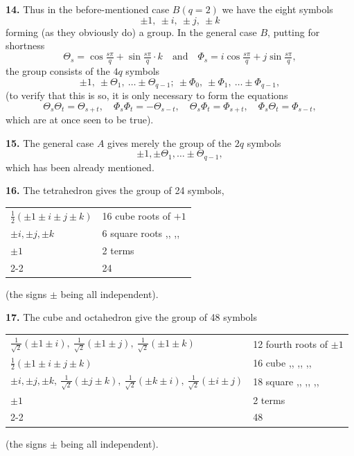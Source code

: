 \documentclass[11pt]{article}
\begin{document}
\textbf{14.} Thus in the before-mentioned case $B(q = 2)$ we have the eight symbols
\[ \pm 1,\ \pm i,\ \pm j,\ \pm k \]
forming (as they obviously do) a group. In the general case $B$, putting for shortness
\[ \Theta_s = \cos\tfrac{s\pi}{q} + \sin\tfrac{s\pi}{q}\cdot k \quad\text{and}\quad \Phi_s = i\cos\tfrac{s\pi}{q} + j\sin\tfrac{s\pi}{q}, \]
the group consists of the $4q$ symbols
\[ \pm 1,\ \pm\Theta_1,\ \ldots \pm\Theta_{q-1};\ \pm\Phi_0,\ \pm\Phi_1,\ \ldots \pm\Phi_{q-1}, \]
(to verify that this is so, it is only necessary to form the equations
\[ \Theta_s\Theta_t = \Theta_{s+t},\quad \Phi_s\Phi_t = -\Theta_{s-t},\quad \Theta_s\Phi_t = \Phi_{s+t},\quad \Phi_s\Theta_t = \Phi_{s-t}, \]
which are at once seen to be true).

\textbf{15.} The general case $A$ gives merely the group of the $2q$ symbols
\[ \pm 1, \pm\Theta_1, \ldots \pm\Theta_{q-1}, \]
which has been already mentioned.

\textbf{16.} The tetrahedron gives the group of 24 symbols,
\begin{center}\begin{tabular}{ll}
$\tfrac{1}{2}(\pm 1 \pm i \pm j \pm k)$ & 16 cube roots of $+ 1$ \\
$\pm i, \pm j, \pm k$ & 6 square roots ,, ,, \\
$\pm 1$ & 2 terms \\\cline{2-2}
& 24
\end{tabular}\end{center}
(the signs $\pm$ being all independent).

\textbf{17.} The cube and octahedron give the group of 48 symbols
\begin{center}\begin{tabular}{ll}
$\tfrac{1}{\sqrt{2}}(\pm 1 \pm i),\ \tfrac{1}{\sqrt{2}}(\pm 1 \pm j),\ \tfrac{1}{\sqrt{2}}(\pm 1 \pm k)$ & 12 fourth roots of $\pm 1$ \\
$\tfrac{1}{2}(\pm 1 \pm i \pm j \pm k)$ & 16 cube ,, ,, ,, \\
$\pm i, \pm j, \pm k,\ \tfrac{1}{\sqrt{2}}(\pm j \pm k),\ \tfrac{1}{\sqrt{2}}(\pm k \pm i),\ \tfrac{1}{\sqrt{2}}(\pm i \pm j)$ & 18 square ,, ,, ,, \\
$\pm 1$ & 2 terms \\\cline{2-2}
& 48
\end{tabular}\end{center}
(the signs $\pm$ being all independent).
\end{document}
